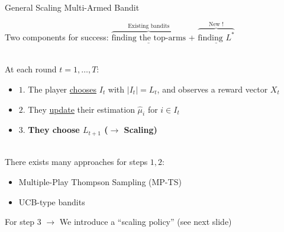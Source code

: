 \documentclass[16pt,usenames,dvipsnames, notheorems]{beamer}
\theoremstyle{definition}
\theoremstyle{example}
\theoremstyle{plain}
\begin{document}
\begin{frame}{General Scaling Multi-Armed Bandit}

{\small
	Two components for success: $\overbrace{\underline{\text{finding the top-arms}}}^{\text{Existing bandits}}$ + $\overbrace{\underline{\text{finding }L^*}}^{\text{New !}}$
	\pause 
	
	~\\
	
	At each round $t = 1,\dots,T$:
	\begin{itemize}
		\item $1$. The player \underline{chooses} $I_t$ with $|I_t|=L_t$, and observes a reward vector $X_t$
		\item $2$. They \underline{update} their estimation $\hat{\mu}_i$ for $i \in I_t$
		\item $3$. \textbf{\textcolor{kitgreen}{They choose $L_{t+1}$ ($\rightarrow$ Scaling)}}
	\end{itemize}
	
	~\\
	
	\pause
	There exists many approaches for steps $1,2$:
	\begin{itemize}
		
		\item Multiple-Play Thompson Sampling (MP-TS) \citep{Thompson1933, DBLP:conf/alt/KaufmannKM12, DBLP:conf/icml/KomiyamaHN15} 
		\item UCB-type bandits \citep{DBLP:journals/ml/AuerCF02, DBLP:conf/nips/ChenHLLLL16, DBLP:journals/jmlr/GarivierC11} 
	\end{itemize}
	
	\pause
	For step 3 $\rightarrow$ We introduce a ``scaling policy'' (see next slide)
}

~\\
\end{frame}
\end{document}
